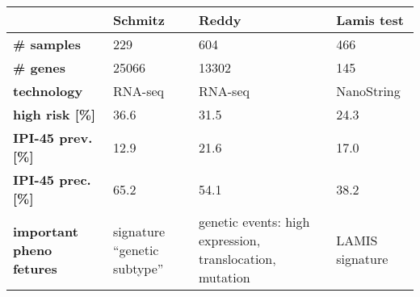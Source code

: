 \begin{table}[ht]
\small
\centering
\begin{tabular}{L{.18\textwidth}R{.2\textwidth}R{.28\textwidth}R{.18\textwidth}}
  \hline
  & \textbf{Schmitz \cite{schmitz18}} & \textbf{Reddy \cite{reddy17}} & \textbf{Lamis test \cite{staiger20}} \\
  \hline
  \textbf{\# samples} & 229 & 604 & 466 \\
  \textbf{\# genes} & 25066 & 13302 & 145 \\
  \textbf{technology} & RNA-seq & RNA-seq & NanoString \\
  \textbf{high risk [\%]} & 36.6 & 31.5\footnotemark{} & 24.3 \\
  \textbf{IPI-45 prev. [\%]} & 12.9 & 21.6 & 17.0 \\
  \textbf{IPI-45 prec. [\%]} & 65.2 & 54.1 & 38.2 \\
  \textbf{important pheno fetures} & signature ``genetic subtype'' & genetic events: high expression, translocation, mutation & LAMIS signature \\
  \hline
\end{tabular}
\end{table}
